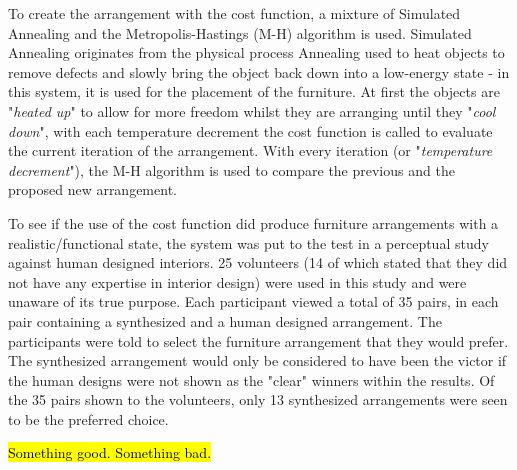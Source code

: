 To create the arrangement with the cost function, a mixture of Simulated Annealing and the Metropolis-Hastings (M-H) algorithm is used. Simulated Annealing originates from the physical process Annealing used to heat objects to remove defects and slowly bring the object back down into a low-energy state \cite{simulated-annealing} - in this system, it is used for the placement of the furniture. At first the objects are "\textit{heated up}" to allow for more freedom whilst they are arranging until they "\textit{cool down}", with each temperature decrement the cost function is called to evaluate the current iteration of the arrangement. With every iteration (or "\textit{temperature decrement}"), the M-H algorithm \cite{understanding-mh-algorithm} is used to compare the previous and the proposed new arrangement.


To see if the use of the cost function did produce furniture arrangements with a realistic/functional state, the system was put to the test in a perceptual study against human designed interiors. 25 volunteers (14 of which stated that they did not have any expertise in interior design) were used in this study and were unaware of its true purpose. Each participant viewed a total of 35 pairs, in each pair containing a synthesized and a human designed arrangement. The participants were told to select the furniture arrangement that they would prefer. The synthesized arrangement would only be considered to have been the victor if the human designs were not shown as the "clear" winners within the results. Of the 35 pairs shown to the volunteers, only 13 synthesized arrangements were seen to be the preferred choice.

\hl{Something good. Something bad.}


